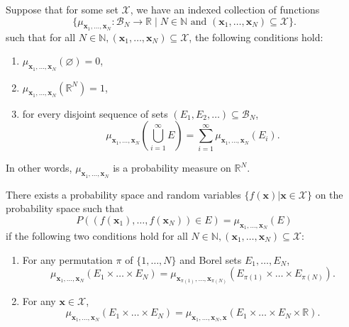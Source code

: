 \begin{theorem}\label{thm:kol-ext}
    Suppose that for some set $\mathcal{X}$, we have an indexed collection of functions
    \begin{equation*}
        \{ \mu_{\mathbf{x}_1, \dots, \mathbf{x}_N} : \mathcal{B}_{N} \to \mathbb{R} \;|\; N \in \mathbb{N} \text{ and } (\mathbf{x}_1, \dots, \mathbf{x}_N) \subseteq \mathcal{X}\}.
    \end{equation*}
    such that for all $N \in \mathbb{N}, (\mathbf{x}_1, \dots, \mathbf{x}_N) \subseteq \mathcal{X}$,
    the following conditions hold:
    \begin{enumerate}
        \item $\mu_{\mathbf{x}_1, \dots, \mathbf{x}_N}( \varnothing) = 0$,

        \item $\mu_{\mathbf{x}_1, \dots, \mathbf{x}_N}(\mathbb{R}^{N}) = 1$,
        \item for every disjoint sequence of sets $(E_1, E_2, \dots) \subseteq \mathcal{B}_N$,
            \begin{equation*}
                \mu_{\mathbf{x}_1, \dots, \mathbf{x}_N}\left(\bigcup_{i = 1}^{\infty}
                E\right) = \sum_{i = 1}^{\infty}\mu_{\mathbf{x}_1, \dots, \mathbf{x}_N}(E_i).
            \end{equation*}
    \end{enumerate}
    In other words, $\mu_{\mathbf{x}_1, \dots, \mathbf{x}_N}$ is a probability measure on $\mathbb{R}^{N}$.

    There exists a probability space and random variables $\{ f(\mathbf{x}) | \mathbf{x} \in \mathcal{X} \}$ 
    on the probability space such that
    \begin{equation*}
        P((f(\mathbf{x}_1), \dots, f(\mathbf{x}_N)) \in E) = \mu_{\mathbf{x}_1, \dots, \mathbf{x}_N}(E)
    \end{equation*}
    if the following two conditions hold for all $N \in \mathbb{N}, (\mathbf{x}_1, \dots, \mathbf{x}_N) \subseteq \mathcal{X}$:
    \begin{enumerate}
        \item For any permutation $\pi$ of $\{ 1, \dots, N \}$ and Borel sets $E_1, \dots, E_N$,
            \begin{equation*}
                \mu_{\mathbf{x}_1, \dots, \mathbf{x}_N}(E_1 \times \dots \times E_N)
                =\mu_{\mathbf{x}_{\pi(1)}, \dots, \mathbf{x}_{\pi(N)}}\left(E_{\pi(1)} \times \dots \times E_{\pi(N)}\right).
            \end{equation*}
        \item For any $\mathbf{x} \in \mathcal{X}$,
            \begin{equation*}
                \mu_{\mathbf{x}_1, \dots, \mathbf{x}_N}(E_1 \times \dots \times E_N)
                =
                \mu_{\mathbf{x}_1, \dots, \mathbf{x}_N, \mathbf{x}}(E_1 \times \dots \times E_N \times \mathbb{R}).
            \end{equation*}
    \end{enumerate}
\end{theorem}
